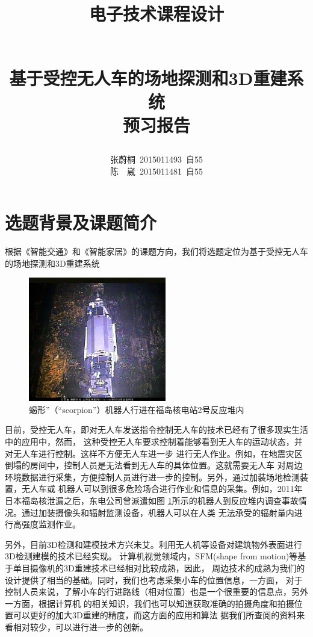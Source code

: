 \documentclass[UTF8,a4paper]{paper}
\title{
    \begin{large}电子技术课程设计\end{large}\\
    基于受控无人车的场地探测和3D重建系统\\
    预习报告
}
\author{
    张蔚桐\ 2015011493\ 自55\\
    陈\ \ 崴\ 2015011481\ 自55}
\begin{document}
\newcommand{\tabincell}[2]{\begin{tabular}{@{}#1@{}}#2\end{tabular}}
\maketitle
\tableofcontents    
\clearpage
\section{选题背景及课题简介}
根据《智能交通》和《智能家居》的课题方向，我们将选题定位为基于受控无人车的场地探测和3D重建系统

\begin{figure}
    \centering
    \includegraphics[width = 60mm]{Robo.jpg}
    \caption{蝎形”（“scorpion”）机器人行进在福岛核电站2号反应堆内}
    \label{Robo}
\end{figure}
目前，受控无人车，即对无人车发送指令控制无人车的技术已经有了很多现实生活中的应用中，然而，
这种受控无人车要求控制着能够看到无人车的运动状态，并对无人车进行控制。这样不方便无人车进一步
进行无人作业。例如，在地震灾区倒塌的房间中，控制人员是无法看到无人车的具体位置。这就需要无人车
对周边环境数据进行采集，方便控制人员进行进一步的控制。另外，通过加装场地检测装置，无人车或
机器人可以到很多危险场合进行作业和信息的采集。例如，2011年日本福岛核泄漏之后，东电公司曾派遣如图
\ref{Robo}所示的机器人到反应堆内调查事故情况。通过加装摄像头和辐射监测设备，机器人可以在人类
无法承受的辐射量内进行高强度监测作业。

另外，目前3D检测和建模技术方兴未艾。利用无人机等设备对建筑物外表面进行3D检测建模的技术已经实现。
计算机视觉领域内，SFM(shape from motion)等基于单目摄像机的3D重建技术已经相对比较成熟，因此，
周边技术的成熟为我们的设计提供了相当的基础。同时，我们也考虑采集小车的位置信息，一方面，
对于控制人员来说，了解小车的行进路线（相对位置）也是一个很重要的信息点，另外一方面，根据计算机
的相关知识，我们也可以知道获取准确的拍摄角度和拍摄位置可以更好的加大3D重建的精度，而这方面的应用和算法
据我们所查阅的资料来看相对较少，可以进行进一步的创新。
\end{document}
